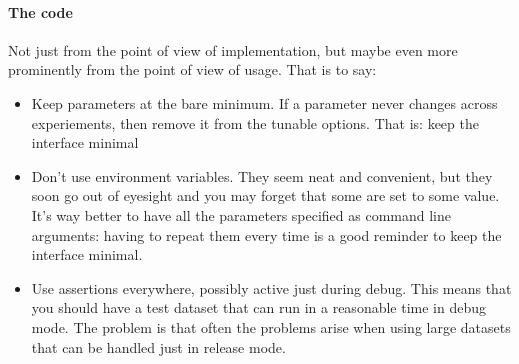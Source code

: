 \documentclass{llncs}
\begin{document}
\paragraph{The code}

Not just from the point of view of implementation, but maybe even more
prominently from the point of view of usage. That is to say:

\begin{itemize}
\item Keep parameters at the bare minimum. If a parameter never changes across
  experiements, then remove it from the tunable options. That is: keep the
  interface minimal
\item Don't use environment variables. They seem neat and convenient, but they soon
  go out of eyesight and you may forget that some are set to some value. It's
  way better to have all the parameters specified as command line arguments:
  having to repeat them every time is a good reminder to keep the interface
  minimal.
\item Use assertions everywhere, possibly active just during debug. This means that
  you should have a test dataset that can run in a reasonable time in debug
  mode. The problem is that often the problems arise when using large datasets
  that can be handled just in release mode.
\end{itemize}
\end{document}
